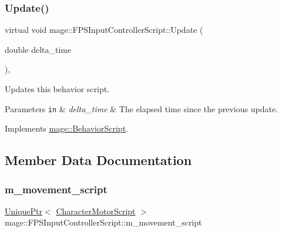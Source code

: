 \hypertarget{classmage_1_1_f_p_s_input_controller_script_ab78955a67341970a41b21ae943b81585}{}\label{classmage_1_1_f_p_s_input_controller_script_ab78955a67341970a41b21ae943b81585} 
\subsubsection{\texorpdfstring{Update()}{Update()}}
{\footnotesize\ttfamily virtual void mage\+::\+F\+P\+S\+Input\+Controller\+Script\+::\+Update (\begin{DoxyParamCaption}\item[{double}]{delta\+\_\+time }\end{DoxyParamCaption})\hspace{0.3cm}{\ttfamily [override]}, {\ttfamily [virtual]}}

Updates this behavior script.


\begin{DoxyParams}[1]{Parameters}
\mbox{\tt in}  & {\em delta\+\_\+time} & The elapsed time since the previous update. \\
\hline
\end{DoxyParams}


Implements \hyperlink{classmage_1_1_behavior_script_a905b6c83640cb91d19fecab3435f6feb}{mage\+::\+Behavior\+Script}.



\subsection{Member Data Documentation}
\hypertarget{classmage_1_1_f_p_s_input_controller_script_adef81e743004c4c182ceb71f9bc35ab6}{}\label{classmage_1_1_f_p_s_input_controller_script_adef81e743004c4c182ceb71f9bc35ab6} 
\subsubsection{\texorpdfstring{m\+\_\+movement\+\_\+script}{m\_movement\_script}}
{\footnotesize\ttfamily \hyperlink{namespacemage_a3316d7143a973e37adf1110f2e80ca31}{Unique\+Ptr}$<$ \hyperlink{classmage_1_1_character_motor_script}{Character\+Motor\+Script} $>$ mage\+::\+F\+P\+S\+Input\+Controller\+Script\+::m\+\_\+movement\+\_\+script\hspace{0.3cm}{\ttfamily [private]}}

